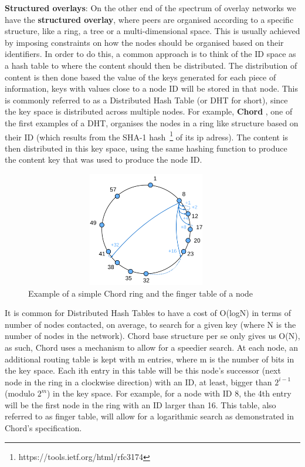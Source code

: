 \textbf{Structured overlays}: On the other end of the spectrum of
overlay networks we have the \textbf{structured overlay}, where peers
are organised according to a specific structure, like a ring, a tree or
a multi-dimensional space. This is usually achieved by imposing
constraints on how the nodes should be organised based on their
identifiers. In order to do this, a common approach is to think of the
ID space as a hash table to where the content should then be
distributed. The distribution of content is then done based the value of
the keys generated for each piece of information, keys with values close
to a node ID will be stored in that node. This is commonly referred to
as a Distributed Hash Table (or DHT for short), since the key space is
distributed across multiple nodes. For example, \textbf{Chord} \cite{Stoica2001},
one of the first examples of a DHT, organises the nodes in a ring like structure
based on their ID (which results from the SHA-1 hash~\footnote{https://tools.ietf.org/html/rfc3174}
of its ip adress). The content is then distributed in this key space, using the same hashing function to
produce the content key that was used to produce the node ID.

\begin{figure}[hb!]
  \centering
  \includegraphics[max height=5cm,max width=0.95\textwidth]{img/chord.png}
  \caption{Example of a simple Chord ring and the finger table of a node}
  \label{fig:chord}
\end{figure}

It is common for Distributed Hash Tables to have a cost of O(log{}N)
in terms of number of nodes
contacted, on average, to search for a given key (where N is the number
of nodes in the network). Chord base structure per se only gives us
O(N), as such, Chord uses a mechanism to allow for a speedier search. At
each node, an additional routing table is kept with m entries, where m
is the number of bits in the key space. Each ith entry in this table
will be this node's successor (next node in the ring in a clockwise
direction) with an ID, at least, bigger than $2^{i-1}$ (modulo $2^{m}$)
in the key space. For example, for
a node with ID 8, the 4th entry will be the first node in the ring with
an ID larger than 16. This table, also referred to as finger table, will
allow for a logarithmic search as demonstrated in Chord's specification.

